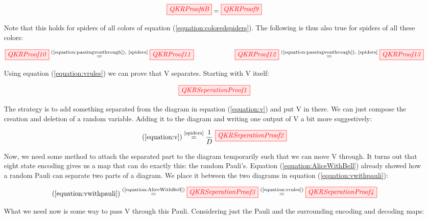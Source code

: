 \documentclass[]{article}
\newcommand{\equaltext}[1]{\ensuremath{\stackrel{\text{#1}}{=}}}
\begin{document}
\begin{equation}
	\label{equation:passingvonthrough}
	 \tikzfig{QKRProof6B} = \tikzfig{QKRProof9}
\end{equation}

Note that this holds for spiders of all colors of equation (\ref{equation:coloredspiders}). The following is thus also true for spiders of all these colors:

\begin{equation}
\label{equation:vrules}
	\tikzfig{QKRProof10} \equaltext{(\ref{equation:passingvonthrough}), \ref{spiders}} \tikzfig{QKRProof11} ~~~~~~~~~~~~~~~~~~ \tikzfig{QKRProof12} \equaltext{(\ref{equation:passingvonthrough}), \ref{spiders}} \tikzfig{QKRProof13}
\end{equation}

Using equation (\ref{equation:vrules}) we can prove that V separates. Starting with V itself:

\begin{equation}
	\label{equation:v}
	\tikzfig{QKRSeperationProof1}
\end{equation}

The strategy is to add something separated from the diagram in equation (\ref{equation:v}) and put V in there. We can just compose the creation and deletion of a random variable. Adding it to the diagram and writing one output of V a bit more suggestively:

\begin{equation}
	\label{equation:vwithpauli}
	(\ref{equation:v}) \equaltext{\ref{spiders}} \frac{1}{D}~
	\tikzfig{QKRSeperationProof2}
\end{equation}

Now, we need some method to attach the separated part to the diagram temporarily such that we can move V through. It turns out that eight state encoding gives us a map that can do exactly this: the random Pauli's. Equation (\ref{equation:AliceWithBell}) already showed how a random Pauli can separate two parts of a diagram. We place it between the two diagrams in equation (\ref{equation:vwithpauli}):

\begin{equation}
(\ref{equation:vwithpauli}) \equaltext{(\ref{equation:AliceWithBell})} \tikzfig{QKRSeperationProof3} \equaltext{(\ref{equation:vrules})} \tikzfig{QKRSeperationProof4}
\end{equation}

What we need now is some way to pass V through this Pauli. Considering just the Pauli and the surrounding encoding and decoding maps:
\end{document}

